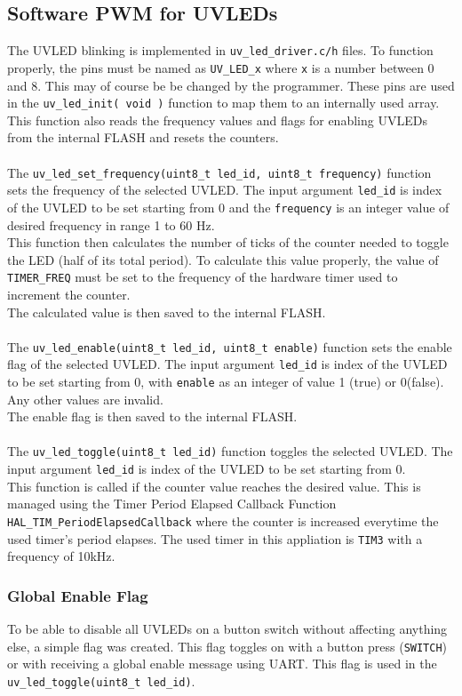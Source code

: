 \documentclass[12pt, a4paper]{article}
\begin{document}
\subsection{Software PWM for UVLEDs}
The UVLED blinking is implemented in \verb|uv_led_driver.c/h| files. To function properly, the pins must be named as \verb|UV_LED_x| where \verb|x| is a number between 0 and 8. This may of course be be changed by the programmer. These pins are used in the \verb|uv_led_init( void )| function to map them to an internally used array. This function also reads the frequency values and flags for enabling UVLEDs from the internal FLASH and resets the counters.\\
\\
The \verb|uv_led_set_frequency(uint8_t led_id, uint8_t frequency)| function sets the frequency of the selected UVLED. The input argument \verb|led_id| is index of the UVLED to be set starting from 0 and the \verb|frequency| is an integer value of desired frequency in range 1 to 60 Hz.\\
This function then calculates the number of ticks of the counter needed to toggle the LED (half of its total period). To calculate this value properly, the value of \verb|TIMER_FREQ| must be set to the frequency of the hardware timer used to increment the counter.\\
The calculated value is then saved to the internal FLASH.\\
\\
The \verb|uv_led_enable(uint8_t led_id, uint8_t enable)| function sets the enable flag of the selected UVLED. The input argument \verb|led_id| is index of the UVLED to be set starting from 0, with \verb|enable| as an integer of value 1 (true) or 0(false). Any other values are invalid.\\
The enable flag is then saved to the internal FLASH.\\
\\
The \verb|uv_led_toggle(uint8_t led_id)| function toggles the selected UVLED. The input argument \verb|led_id| is index of the UVLED to be set starting from 0.\\
This function is called if the counter value reaches the desired value. This is managed using the Timer Period Elapsed Callback Function \verb|HAL_TIM_PeriodElapsedCallback| where the counter is increased everytime the used timer's period elapses. The used timer in this appliation is \verb|TIM3| with a frequency of 10kHz.
\subsubsection{Global Enable Flag}
To be able to disable all UVLEDs on a button switch without affecting anything else, a simple flag was created. This flag toggles on with a button press (\verb|SWITCH|) or with receiving a global enable message using UART. This flag is used in the \verb|uv_led_toggle(uint8_t led_id)|.
\end{document}
